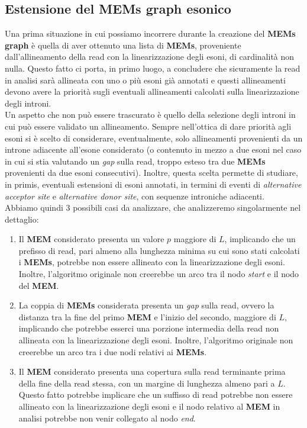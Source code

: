 \documentclass[a4paper,12pt, oneside]{book}
\begin{document}
\subsection{Estensione del MEMs graph esonico}
Una prima situazione in cui possiamo incorrere durante la creazione del
\textbf{MEMs graph} è quella di aver ottenuto una lista di \textbf{MEMs},
proveniente dall'allineamento della read con la linearizzazione degli esoni,
di cardinalità non nulla. Questo fatto ci porta, in primo luogo, a concludere
che sicuramente la read in analisi sarà allineata con uno o più esoni già
annotati e questi allineamenti devono avere la priorità sugli eventuali
allineamenti calcolati sulla linearizzazione degli introni.\\
Un aspetto che non può essere trascurato è quello della selezione degli introni
in cui può essere validato un allineamento. Sempre nell'ottica di dare priorità
agli esoni si è scelto di considerare, eventualmente, solo allineamenti
provenienti da un introne adiacente all'esone considerato (o contenuto in mezzo
a due esoni nel caso in cui si stia valutando un \textit{gap} sulla read,
troppo esteso tra 
due \textbf{MEMs} provenienti da due esoni consecutivi). Inoltre, questa scelta
permette di studiare, in primis, eventuali estensioni di esoni annotati, in
termini di eventi di \textit{alternative acceptor site} e \textit{alternative
  donor site}, con sequenze introniche adiacenti.\\
Abbiamo quindi 3 possibili casi da analizzare, che analizzeremo singolarmente
nel dettaglio:
\begin{enumerate}
  \item Il \textbf{MEM} considerato presenta un valore $p$ maggiore di $L$,
  implicando che un prefisso di read, pari almeno alla lunghezza
  minima su cui sono stati calcolati i \textbf{MEMs}, potrebbe non essere
  allineato con la linearizzazione degli esoni. Inoltre, l'algoritmo originale
  non creerebbe un arco tra il nodo \textit{start} e il nodo del \textbf{MEM}.   
  \item La coppia di \textbf{MEMs} considerata presenta un \textit{gap} sulla
  read, ovvero la distanza tra la fine del primo \textbf{MEM} e l'inizio del
  secondo, maggiore di $L$, implicando 
  che potrebbe esserci una porzione intermedia della read non allineata con la
  linearizzazione degli esoni. Inoltre, l'algoritmo originale
  non creerebbe un arco tra i due nodi relativi ai \textbf{MEMs}.
  \item Il \textbf{MEM} considerato presenta una copertura sulla read terminante
  prima della fine della read stessa, con un margine di lunghezza almeno pari a
  $L$. Questo fatto potrebbe implicare che un suffisso di read potrebbe
  non essere allineato con la linearizzazione degli esoni e il nodo relativo al
  \textbf{MEM} in analisi potrebbe non venir collegato al nodo \textit{end}.
\end{enumerate}
\end{document}
